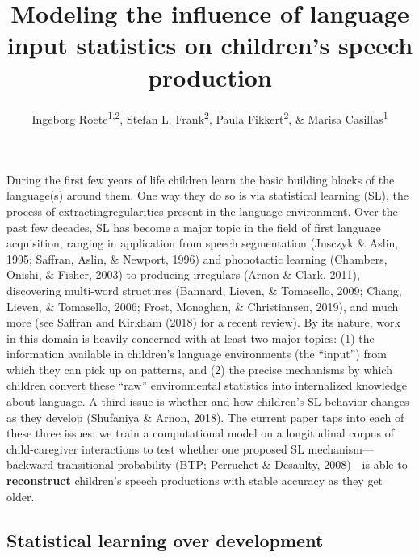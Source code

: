 \documentclass[
  english,
  man,mask,floatsintext]{apa6}
\title{Modeling the influence of language input statistics on children's speech production}
\author{Ingeborg Roete\textsuperscript{1,2}, Stefan L. Frank\textsuperscript{2}, Paula Fikkert\textsuperscript{2}, \& Marisa Casillas\textsuperscript{1}}
\date{}
\begin{document}
\maketitle

During the first few years of life children learn the basic building blocks of the language(s) around them. One way they do so is via statistical learning (SL), the process of extractingregularities present in the language environment. Over the past few decades, SL has become a major topic in the field of first language acquisition, ranging in application from speech segmentation (Jusczyk \& Aslin, 1995; Saffran, Aslin, \& Newport, 1996) and phonotactic learning (Chambers, Onishi, \& Fisher, 2003) to producing irregulars (Arnon \& Clark, 2011), discovering multi-word structures (Bannard, Lieven, \& Tomasello, 2009; Chang, Lieven, \& Tomasello, 2006; Frost, Monaghan, \& Christiansen, 2019), and much more (see Saffran and Kirkham (2018) for a recent review). By its nature, work in this domain is heavily concerned with at least two major topics: (1) the information available in children's language environments (the \enquote{input}) from which they can pick up on patterns, and (2) the precise mechanisms by which children convert these \enquote{raw} environmental statistics into internalized knowledge about language. A third issue is whether and how children's SL behavior changes as they develop (Shufaniya \& Arnon, 2018). The current paper taps into each of these three issues: we train a computational model on a longitudinal corpus of child-caregiver interactions to test whether one proposed SL mechanism---backward transitional probability (BTP; Perruchet \& Desaulty, 2008)---is able to \textbf{reconstruct} children's speech productions with stable accuracy as they get older.

\hypertarget{statistical-learning-over-development}{%
\subsection{\texorpdfstring{\textbf{Statistical learning} over development}{Statistical learning over development}}\label{statistical-learning-over-development}}
\end{document}

